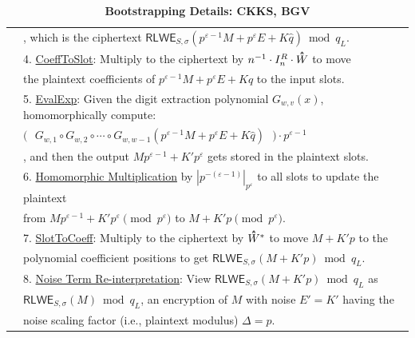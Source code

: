 \begin{table}[h]
\begin{tabular}{|c||l|}
& \text{ } \text{ } , which is the ciphertext $\textsf{RLWE}_{S, \sigma}(p^{\varepsilon-1}M + p^\varepsilon E + K\hat{q}) \bmod q_L$.\\
&4. \underline{\textsf{CoeffToSlot}}: Multiply to the ciphertext by $n^{-1}\cdot I_n^R \cdot \hathat W$ to move\\
& \text{ } \text{ } the plaintext coefficients of $p^{\varepsilon-1}M + p^\varepsilon E + K\hat{q}$ to the input slots.\\
&5. \underline{\textsf{EvalExp}}: Given the digit extraction polynomial $G_{w, v}(x)$, homomorphically compute:\\
&\text{ } \text{ } $\bm(\text{ } G_{w, 1} \circ G_{w, 2}\circ \cdots \circ G_{w, w-1} (p^{\varepsilon-1} M + p^\varepsilon E + K\hat{q})\text{ } \bm) \cdot p^{\varepsilon-1}$\\
&\text{ } \text{ } , and then the output $Mp^{\varepsilon - 1} + K'p^\varepsilon$ gets stored in the plaintext slots.\\
&6. \underline{Homomorphic Multiplication} by $|p^{-(\varepsilon-1)}|_{p^\varepsilon}$ to all slots to update the plaintext \\
&\text{ } \text{ }  from $Mp^{\varepsilon - 1} + K'p^\varepsilon \pmod{p^\varepsilon}$ to $M + K'p \pmod{p^\varepsilon}$.\\
&7. \underline{\textsf{SlotToCoeff}}: Multiply to the ciphertext by $\hathat W^*$ to move $M + K'p$ to the \\
&\text{ } \text{ } polynomial coefficient positions to get $\textsf{RLWE}_{S, \sigma}(M + K'p) \bmod q_L$.\\
&8. \underline{Noise Term Re-interpretation}: View $\textsf{RLWE}_{S, \sigma}(M + K'p) \bmod q_L$ as\\
&\text{ } \text{ }  $\textsf{RLWE}_{S, \sigma}(M) \bmod q_L$, an encryption of $M$ with noise $E' = K'$ having the\\
& \text{ } \text{ } noise scaling factor (i.e., plaintext modulus) $\Delta = p$.\\\hline
\end{tabular}
\caption{\textbf{Bootstrapping Details: CKKS, BGV}}
\end{table}

